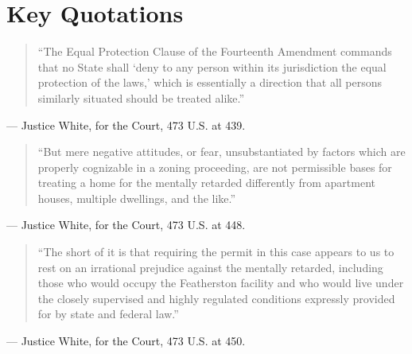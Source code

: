 \documentclass[12pt]{article}
\begin{document}
\section{Key Quotations}

\begin{quote}
``The Equal Protection Clause of the Fourteenth Amendment commands that no State shall `deny to any person within its jurisdiction the equal protection of the laws,' which is essentially a direction that all persons similarly situated should be treated alike.''
\end{quote}
\noindent --- Justice White, for the Court, 473 U.S. at 439.

\begin{quote}
``But mere negative attitudes, or fear, unsubstantiated by factors which are properly cognizable in a zoning proceeding, are not permissible bases for treating a home for the mentally retarded differently from apartment houses, multiple dwellings, and the like.''
\end{quote}
\noindent --- Justice White, for the Court, 473 U.S. at 448.

\begin{quote}
``The short of it is that requiring the permit in this case appears to us to rest on an irrational prejudice against the mentally retarded, including those who would occupy the Featherston facility and who would live under the closely supervised and highly regulated conditions expressly provided for by state and federal law.''
\end{quote}
\noindent --- Justice White, for the Court, 473 U.S. at 450.
\end{document}
